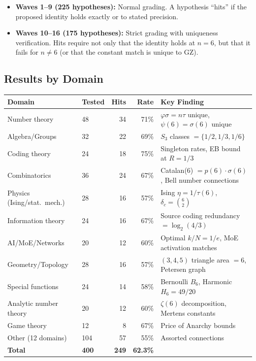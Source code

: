 \documentclass[11pt,a4paper]{article}
\begin{document}
\begin{itemize}
  \item \textbf{Waves 1--9 (225 hypotheses):} Normal grading. A hypothesis ``hits'' if the proposed identity holds exactly or to stated precision.
  \item \textbf{Waves 10--16 (175 hypotheses):} Strict grading with uniqueness verification. Hits require not only that the identity holds at $n = 6$, but that it fails for $n \neq 6$ (or that the constant match is unique to GZ).
\end{itemize}

\subsection{Results by Domain}

\begin{center}
\begin{tabular}{llrrl}
\toprule
Domain & Tested & Hits & Rate & Key Finding \\
\midrule
Number theory & 48 & 34 & 71\% & $\varphi \sigma = n\tau$ unique, $\psi(6) = \sigma(6)$ unique \\
Algebra/Groups & 32 & 22 & 69\% & $S_3$ classes $= \{1/2, 1/3, 1/6\}$ \\
Coding theory & 24 & 18 & 75\% & Singleton rates, EB bound at $R = 1/3$ \\
Combinatorics & 36 & 24 & 67\% & Catalan(6) $= p(6)\cdot\sigma(6)$, Bell number connections \\
Physics (Ising/stat.\ mech.) & 28 & 16 & 57\% & Ising $\eta = 1/\tau(6)$, $\delta_c = \binom{6}{2}$ \\
Information theory & 24 & 16 & 67\% & Source coding redundancy $= \log_2(4/3)$ \\
AI/MoE/Networks & 20 & 12 & 60\% & Optimal $k/N = 1/e$, MoE activation matches \\
Geometry/Topology & 28 & 16 & 57\% & $(3,4,5)$ triangle area $= 6$, Petersen graph \\
Special functions & 24 & 14 & 58\% & Bernoulli $B_6$, Harmonic $H_6 = 49/20$ \\
Analytic number theory & 20 & 12 & 60\% & $\zeta(6)$ decomposition, Mertens constants \\
Game theory & 12 & 8 & 67\% & Price of Anarchy bounds \\
Other (12 domains) & 104 & 57 & 55\% & Assorted connections \\
\midrule
\textbf{Total} & \textbf{400} & \textbf{249} & \textbf{62.3\%} & \\
\bottomrule
\end{tabular}
\end{center}
\end{document}
